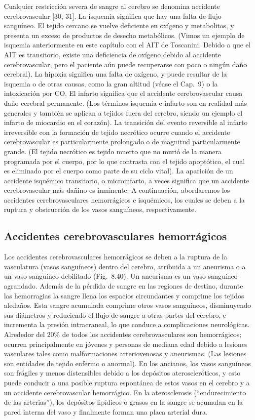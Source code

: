\documentclass[12pt]{book}
\begin{document}
Cualquier restricción severa de sangre al cerebro se denomina accidente cerebrovascular [30, 31]. La isquemia significa que hay una falta de flujo sanguíneo. El tejido cercano se vuelve deficiente en oxígeno y metabolitos, y presenta un exceso de productos de desecho metabólicos. (Vimos un ejemplo de isquemia anteriormente en este capítulo con el AIT de Toscanini. Debido a que el AIT es transitorio, existe una deficiencia de oxígeno debido al accidente cerebrovascular, pero el paciente aún puede recuperarse con poco o ningún daño cerebral). La hipoxia significa una falta de oxígeno, y puede resultar de la isquemia o de otras causas, como la gran altitud (véase el Cap.~9) o la intoxicación por CO. El infarto significa que el accidente cerebrovascular causa daño cerebral permanente. (Los términos isquemia e infarto son en realidad más generales y también se aplican a tejidos fuera del cerebro, siendo un ejemplo el infarto de miocardio en el corazón). La transición del evento reversible al infarto irreversible con la formación de tejido necrótico ocurre cuando el accidente cerebrovascular es particularmente prolongado o de magnitud particularmente grande. (El tejido necrótico es tejido muerto que no murió de la manera programada por el cuerpo, por lo que contrasta con el tejido apoptótico, el cual es eliminado por el cuerpo como parte de su ciclo vital). La aparición de un accidente isquémico transitorio, o microinfarto, a veces significa que un accidente cerebrovascular más dañino es inminente. A continuación, abordaremos los accidentes cerebrovasculares hemorrágicos e isquémicos, los cuales se deben a la ruptura y obstrucción de los vasos sanguíneos, respectivamente.

\subsection{Accidentes cerebrovasculares hemorrágicos}

Los accidentes cerebrovasculares hemorrágicos se deben a la ruptura de la vasculatura (vasos sanguíneos) dentro del cerebro, atribuida a un aneurisma o a un vaso sanguíneo debilitado (Fig.~8.40). Un aneurisma es un vaso sanguíneo agrandado. Además de la pérdida de sangre en las regiones de destino, durante las hemorragias la sangre llena los espacios circundantes y comprime los tejidos aledaños. Esta sangre acumulada comprime otros vasos sanguíneos, disminuyendo sus diámetros y reduciendo el flujo de sangre a otras partes del cerebro, e incrementa la presión intracraneal, lo que conduce a complicaciones neurológicas. Alrededor del $20\%$ de todos los accidentes cerebrovasculares son hemorrágicos; ocurren principalmente en jóvenes y personas de mediana edad debido a lesiones vasculares tales como malformaciones arteriovenosas y aneurismas. (Las lesiones son entidades de tejido enfermo o anormal). En los ancianos, los vasos sanguíneos son frágiles y menos distensibles debido a los depósitos ateroscleróticos, y esto puede conducir a una posible ruptura espontánea de estos vasos en el cerebro y a un accidente cerebrovascular hemorrágico. En la aterosclerosis (``endurecimiento de las arterias''), los depósitos lipídicos o grasos en la sangre se acumulan en la pared interna del vaso y finalmente forman una placa arterial dura.
\end{document}
